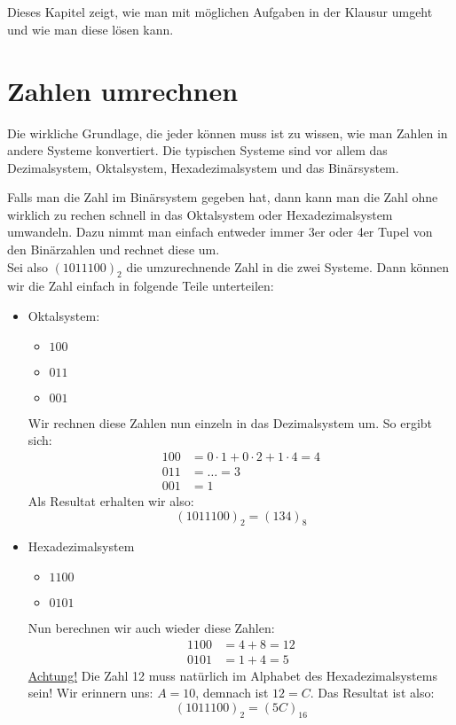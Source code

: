 \section{}
Dieses Kapitel zeigt, wie man mit möglichen Aufgaben in der Klausur umgeht und wie man diese lösen kann.

\section*{Zahlen umrechnen}
Die wirkliche Grundlage, die jeder können muss ist zu wissen, wie man Zahlen in andere Systeme konvertiert. Die typischen Systeme sind vor allem das Dezimalsystem, Oktalsystem, Hexadezimalsystem und das Binärsystem.

Falls man die Zahl im Binärsystem gegeben hat, dann kann man die Zahl ohne wirklich zu rechen schnell in das Oktalsystem oder Hexadezimalsystem umwandeln.
Dazu nimmt man einfach entweder immer 3er oder 4er Tupel von den Binärzahlen und rechnet diese um. \\
Sei also $(1011100)_2$ die umzurechnende Zahl in die zwei Systeme. Dann können wir die Zahl einfach in folgende Teile unterteilen:
\begin{itemize}
	\item Oktalsystem:
		\begin{itemize}
			\item $100$
			\item $011$
			\item $001$ 
		\end{itemize}
		Wir rechnen diese Zahlen nun einzeln in das Dezimalsystem um. So ergibt sich:
		\begin{align*}
			100 &= 0\cdot 1 + 0 \cdot 2 + 1\cdot 4 = 4 \\
			011 &= \ldots = 3 \\
			001 &= 1 
		\end{align*}
		Als Resultat erhalten wir also: 
		\[
			(1011100)_2 = (134)_8
		\]
	\item Hexadezimalsystem
		\begin{itemize}
			\item $1100$
			\item $0101$ 
		\end{itemize}
		Nun berechnen wir auch wieder diese Zahlen:
		\begin{align*}
			1100 &= 4+8 = 12 \\
			0101 &= 1+ 4 =5 
		\end{align*}
		\underline{Achtung!} Die Zahl 12 muss natürlich im Alphabet des Hexadezimalsystems sein! 
		Wir erinnern uns: $A=10$, demnach ist $12=C$.
		Das Resultat ist also:
		\[
			(1011100)_2 = (5C)_{16}	
		\]
\end{itemize}
